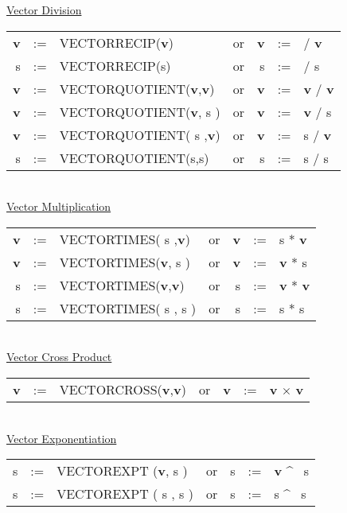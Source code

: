 \underline{Vector Division}\\
\begin{tabular}{rclcrcl}
{\bf v} &:=& VECTORRECIP({\bf v})  &{\rm or}& {\bf v} &:=&  /  
{\bf v} \\
 s  &:=& VECTORRECIP(s)  &{\rm or} &      s  &:=&  /       s  \\
{\bf v} &:=& VECTORQUOTIENT({\bf v},{\bf v})  &{\rm or }& {\bf v} &:=&  
{\bf v} /  {\bf v} \\
{\bf v} &:=& VECTORQUOTIENT({\bf v},    s  )  &{\rm or }& {\bf v} &:=&  
{\bf v} /     s    \\
{\bf v} &:=& VECTORQUOTIENT(   s   ,{\bf v})  &{\rm or }& {\bf v} &:=&  
   s    /  {\bf v} \\
     s  &:=& VECTORQUOTIENT(s,s)  &{\rm or }&      s  &:=&  s / s       
       \\
\end{tabular} \\

\underline{Vector Multiplication}\\ 
\begin{tabular}{rclcrcl}
{\bf v} &:=& VECTORTIMES(   s   ,{\bf v})  &{\rm or }& {\bf v} &:=&     
s    *  {\bf v} \\
{\bf v} &:=& VECTORTIMES({\bf v},   s   )  &{\rm or }& {\bf v} &:=& {\bf
 v}  *     s    \\
   s    &:=& VECTORTIMES({\bf v},{\bf v})  &{\rm or }&    s    &:=& {\bf
 v}  *  {\bf v} \\
   s    &:=& VECTORTIMES(   s   ,   s   )  &{\rm or }&    s    &:=&     
s    *     s    \\
\end{tabular} \\
 
\underline{Vector Cross Product} \\
\begin{tabular}{rclcrcl}
{\bf v} &:=& VECTORCROSS({\bf v},{\bf v})  &{\rm or }& {\bf v} &:=& {\bf
 v} $\times$   {\bf v} \\
\end{tabular} \\
 
\underline{Vector Exponentiation}\\
\begin{tabular}{rclcrcl}
   s    &:=& VECTOREXPT ({\bf v},   s   )  &{\rm or }&    s    &:=& {\bf
 v}  \^~ s   \\
   s    &:=& VECTOREXPT (   s   ,   s   )  &{\rm or }&    s    &:=&    s
     \^~ s   \\
\end{tabular} \\

